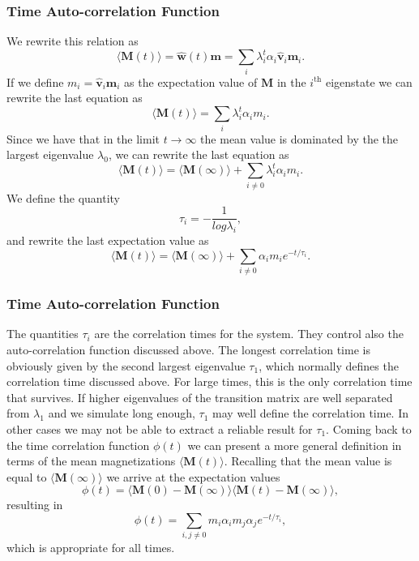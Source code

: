 \documentclass{beamer}
\begin{document}
\begin{frame}
\frametitle{Time Auto-correlation Function}

\begin{block}{}
We rewrite this relation  as
 \[
 \langle \mathbf{M}(t) \rangle  = \mathbf{\hat{w}}(t)\mathbf{m}=\sum_i\lambda_i^t\alpha_i\mathbf{\hat{v}}_i\mathbf{m}_i.
\] 
If we define $m_i=\mathbf{\hat{v}}_i\mathbf{m}_i$ as the expectation value of
$\mathbf{M}$ in the $i^{\mathrm{th}}$ eigenstate we can rewrite the last equation as
 \[
 \langle \mathbf{M}(t) \rangle  = \sum_i\lambda_i^t\alpha_im_i.
\] 
Since we have that in the limit $t\rightarrow \infty$ the mean value is dominated by the 
the largest eigenvalue $\lambda_0$, we can rewrite the last equation as
 \[
 \langle \mathbf{M}(t) \rangle  = \langle \mathbf{M}(\infty) \rangle+\sum_{i\ne 0}\lambda_i^t\alpha_im_i.
\] 
We define the quantity
\[
   \tau_i=-\frac{1}{log\lambda_i},
\]
and rewrite the last expectation value as
 \[
 \langle \mathbf{M}(t) \rangle  = \langle \mathbf{M}(\infty) \rangle+\sum_{i\ne 0}\alpha_im_ie^{-t/\tau_i}.
\label{eq:finalmeanm}
\] 
\end{block}
\end{frame}

\begin{frame}
\frametitle{Time Auto-correlation Function}

\begin{block}{}

The quantities $\tau_i$ are the correlation times for the system. They control also the auto-correlation function 
discussed above.  The longest correlation time is obviously given by the second largest
eigenvalue $\tau_1$, which normally defines the correlation time discussed above. For large times, this is the 
only correlation time that survives. If higher eigenvalues of the transition matrix are well separated from 
$\lambda_1$ and we simulate long enough,  $\tau_1$ may well define the correlation time. 
In other cases we may not be able to extract a reliable result for $\tau_1$. 
Coming back to the time correlation function $\phi(t)$ we can present a more general definition in terms
of the mean magnetizations $ \langle \mathbf{M}(t) \rangle$. Recalling that the mean value is equal 
to $ \langle \mathbf{M}(\infty) \rangle$ we arrive at the expectation values
\[
\phi(t) =\langle \mathbf{M}(0)-\mathbf{M}(\infty)\rangle \langle \mathbf{M}(t)-\mathbf{M}(\infty)\rangle,
\]
resulting in
\[
\phi(t) =\sum_{i,j\ne 0}m_i\alpha_im_j\alpha_je^{-t/\tau_i},
\]
which is appropriate for all times.
\end{block}
\end{frame}
\end{document}
